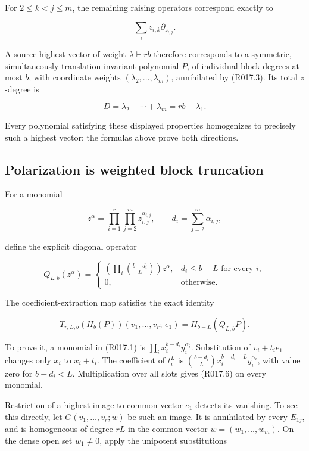 \documentclass[
  10pt,
]{article}
\begin{document}
For \(2\le k<j\le m\), the remaining raising operators correspond
exactly to

\[
 \sum_i z_{i,k}\partial_{z_{i,j}}.
 \tag{R017.3}
\]

A source highest vector of weight \(\lambda\vdash rb\) therefore
corresponds to a symmetric, simultaneously translation-invariant
polynomial \(P\), of individual block degrees at most \(b\), with
coordinate weights \((\lambda_2,\ldots,\lambda_m)\), annihilated by
(R017.3). Its total \(z\)-degree is

\[
 D=\lambda_2+\cdots+\lambda_m=rb-\lambda_1.
 \tag{R017.4}
\]

Every polynomial satisfying these displayed properties homogenizes to
precisely such a highest vector; the formulas above prove both
directions.

\subsection{Polarization is weighted block
truncation}\label{polarization-is-weighted-block-truncation}

For a monomial

\[
 z^\alpha=\prod_{i=1}^r\prod_{j=2}^m z_{i,j}^{\alpha_{i,j}},
 \qquad d_i=\sum_{j=2}^m\alpha_{i,j},
\]

define the explicit diagonal operator

\[
 Q_{L,b}(z^\alpha)=
 \begin{cases}
 \left(\prod_i\binom{b-d_i}{L}\right)z^\alpha,
       &d_i\le b-L\text{ for every }i,\\
 0,&\text{otherwise}.
 \end{cases}
 \tag{R017.5}
\]

The coefficient-extraction map satisfies the exact identity

\[
 T_{r,L,b}(H_b(P))(v_1,\ldots,v_r;\,e_1)
 =H_{b-L}(Q_{L,b}P).
 \tag{R017.6}
\]

To prove it, a monomial in (R017.1) is
\(\prod_i x_i^{b-d_i}y_i^{\alpha_i}\). Substitution of \(v_i+t_ie_1\)
changes only \(x_i\) to \(x_i+t_i\). The coefficient of \(t_i^L\) is
\(\binom{b-d_i}{L}x_i^{b-d_i-L}y_i^{\alpha_i}\), with value zero for
\(b-d_i<L\). Multiplication over all slots gives (R017.6) on every
monomial.

Restriction of a highest image to common vector \(e_1\) detects its
vanishing. To see this directly, let \(G(v_1,\ldots,v_r;w)\) be such an
image. It is annihilated by every \(E_{1j}\), and is homogeneous of
degree \(rL\) in the common vector \(w=(w_1,\ldots,w_m)\). On the dense
open set \(w_1\ne0\), apply the unipotent substitutions
\end{document}
